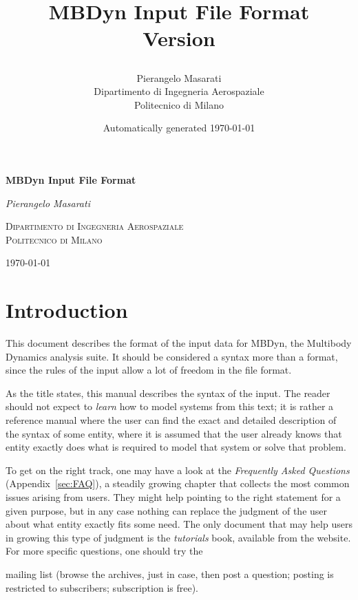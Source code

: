 \documentclass[10pt]{report}
\begin{document}
\begin{latexonly}
\title{\bf MBDyn Input File Format \\
Version

}
\author{Pierangelo Masarati \vspace{5mm}\\
    \sc Dipartimento di Ingegneria Aerospaziale \\
    \sc Politecnico di Milano}
\date{Automatically generated \today}
\maketitle
\end{latexonly}

\begin{htmlonly}
\begin{center}
\textbf{\LARGE MBDyn Input File Format}

\emph{\large Pierangelo Masarati}

\textsc{Dipartimento di Ingegneria Aerospaziale \\ Politecnico di Milano}

\today
\end{center}
\end{htmlonly}

\pagestyle{plain}

\tableofcontents
\newpage
\listoffigures
\newpage
\listoftables
\newpage

\chapter*{Introduction}
This document describes the format of the input data for MBDyn,
the Multibody Dynamics analysis suite.
It should be considered a syntax more than a format, since the rules of the
input allow a lot of freedom in the file format. 

As the title states, this manual describes the syntax of the input.
The reader should not expect to \emph{learn} how to model systems
from this text; it is rather a reference manual where the user
can find the exact and detailed description of the syntax of some
entity, where it is assumed that the user already knows that entity
exactly does what is required to model that system or solve that problem.

To get on the right track, one may have a look at the 
\emph{Frequently Asked Questions} (Appendix~\ref{sec:FAQ}),
a steadily growing chapter that collects the most common issues
arising from users.
They might help pointing to the right statement for a given purpose,
but in any case nothing can replace the judgment of the user
about what entity exactly fits some need.
The only document that may help users in growing this type of judgment
is the \emph{tutorials} book, available from the website.
For more specific questions, one should try the
\begin{quote}
\end{quote}
mailing list (browse the archives, just in case, then post a question;
posting is restricted to subscribers; subscription is free).
\end{document}
